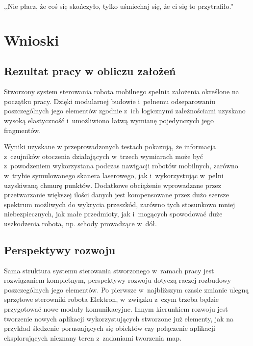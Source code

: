 

\begin{savequote}[70mm]
,,Nie płacz, że coś się skończyło, tylko uśmiechaj się, że ci się to przytrafiło.''
\end{savequote}


\chapter{Wnioski}
\label{chap:wnioski}

\section{Rezultat pracy w obliczu założeń}

Stworzony system sterowania robota mobilnego spełnia założenia określone na początku pracy.
Dzięki modularnej budowie i~pełnemu odseparowaniu poszczególnych jego elementów
zgodnie z~ich logicznymi zależnościami uzyskano wysoką elastyczność i~umożliwiono
łatwą wymianę pojedynczych jego fragmentów.

Wyniki uzyskane w przeprowadzonych testach pokazują, że informacja z~czujników otoczenia
działających w~trzech wymiarach może być z~powodzeniem wykorzystana podczas nawigacji
robotów mobilnych, zarówno w~trybie symulowanego skanera laserowego, jak i~wykorzystując
w~pełni uzyskiwaną chmurę punktów. Dodatkowe obciążenie wprowadzane przez przetwarzanie
większej ilości danych jest kompensowane przez dużo szersze spektrum możliwych do
wykrycia przeszkód, zarówno tych stosunkowo mniej niebezpiecznych, jak małe przedmioty,
jak i~mogących spowodować duże uszkodzenia robota, np. schody prowadzące w~dół.


\section{Perspektywy rozwoju}

Sama struktura systemu sterowania stworzonego w~ramach pracy jest rozwiązaniem kompletnym,
perspektywy rozwoju dotyczą raczej rozbudowy poszczególnych jego elementów. Po pierwsze w~najbliższym
czasie zmianie ulegną sprzętowe sterowniki robota Elektron, w~związku z~czym trzeba będzie
przygotować nowe moduły komunikacyjne. Innym kierunkiem rozwoju jest tworzenie nowych
aplikacji wykorzystujących stworzone już elementy, jak na przykład śledzenie poruszających
się obiektów czy połączenie aplikacji eksplorujących nieznany teren z~zadaniami tworzenia
map.

